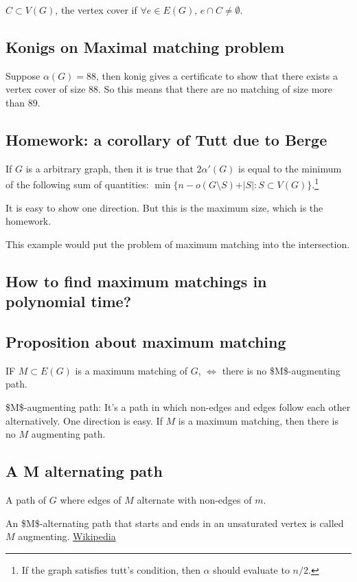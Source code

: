 \documentclass[11pt]{article}
\def\min{\operatorname{min}}
\begin{document}
\(C \subset V(G)\), the vertex cover if \(\forall e \in E(G)\), \(e\cap C \neq
   \emptyset\).
\subsection{Konigs on Maximal matching problem}
\label{sec:org34f1145}
Suppose \(\alpha(G) = 88\), then konig gives a certificate to show that there
exists a vertex cover of size \(88\). So this means that there are no matching
of size more than \(89\).
\subsection{Homework: a corollary of Tutt due to Berge}
\label{sec:org5ef437e}
If \(G\) is a arbitrary graph, then it is true that \(2\alpha'(G)\) is equal to
the minimum of the following sum of quantities: \(\min \{ n - o(G\setminus
   S) + \vert S \vert \colon S \subset V(G) \}\).\footnote{If the graph satisfies tutt's condition, then \(\alpha\) should evaluate
to \(n/2\).}

It is easy to show one direction. But this is the maximum size, which is the homework.

This example would put the problem of maximum matching into the intersection.
\subsection{How to find maximum matchings in polynomial time?}
\label{sec:org8c2e9a2}
\subsection{Proposition about maximum matching}
\label{sec:orgd65dd07}
IF \(M \subset E(G)\) is a maximum matching of \(G\), \(\iff\) there is no
\$M\$-augmenting path.

\$M\$-augmenting path: It's a path in which non-edges and edges follow each
other alternatively. One direction is easy. If \(M\) is a maximum matching,
then there is no \(M\) augmenting path.
\subsection{A M alternating path}
\label{sec:org26f25f7}
A path of \(G\) where edges of \(M\) alternate with non-edges of \(m\).

An \$M\$-alternating path that starts and ends in an unsaturated vertex is
called \(M\) augmenting. \href{https://en.wikipedia.org/wiki/Saturation\_(graph\_theory)}{Wikipedia}
\end{document}
